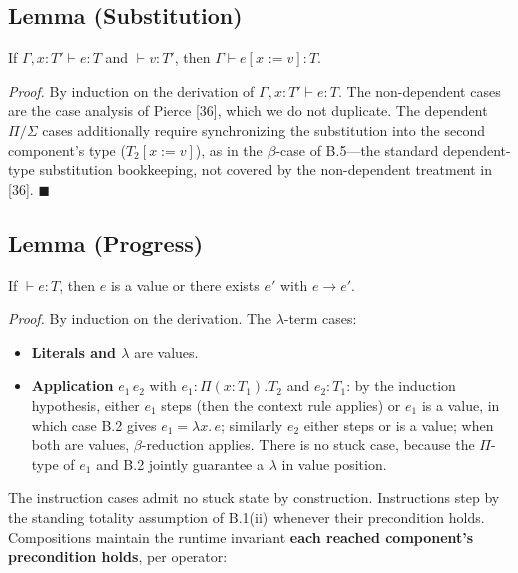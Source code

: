 \documentclass[
  11pt,
]{article}
\providecommand{\tightlist}{%
  \setlength{\itemsep}{0pt}\setlength{\parskip}{0pt}}
\begin{document}
\subsection{Lemma (Substitution)}\label{lemma-substitution}

If \(\Gamma, x{:}T' \vdash e : T\) and \(\vdash v : T'\), then
\(\Gamma \vdash e[x := v] : T\).

\emph{Proof.} By induction on the derivation of
\(\Gamma, x{:}T' \vdash e : T\). The non-dependent cases are the case
analysis of Pierce {[}36{]}, which we do not duplicate. The dependent
\(\Pi/\Sigma\) cases additionally require synchronizing the substitution
into the second component's type (\(T_2[x := v]\)), as in the
\(\beta\)-case of B.5---the standard dependent-type substitution
bookkeeping, not covered by the non-dependent treatment in {[}36{]}.
\(\blacksquare\)

\subsection{Lemma (Progress)}\label{lemma-progress}

If \(\vdash e : T\), then \(e\) is a value or there exists \(e'\) with
\(e \rightarrow e'\).

\emph{Proof.} By induction on the derivation. The \(\lambda\)-term
cases:

\begin{itemize}
\tightlist
\item
  \textbf{Literals and \(\lambda\)} are values.
\item
  \textbf{Application} \(e_1\,e_2\) with \(e_1 : \Pi(x:T_1).T_2\) and
  \(e_2 : T_1\): by the induction hypothesis, either \(e_1\) steps (then
  the context rule applies) or \(e_1\) is a value, in which case B.2
  gives \(e_1 = \lambda x.\,e\); similarly \(e_2\) either steps or is a
  value; when both are values, \(\beta\)-reduction applies. There is no
  stuck case, because the \(\Pi\)-type of \(e_1\) and B.2 jointly
  guarantee a \(\lambda\) in value position.
\end{itemize}

The instruction cases admit no stuck state by construction. Instructions
step by the standing totality assumption of B.1(ii) whenever their
precondition holds. Compositions maintain the runtime invariant
\textbf{each reached component's precondition holds}, per operator:
\end{document}
